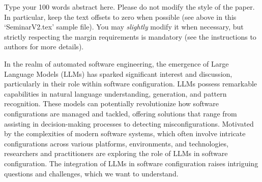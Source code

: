 Type your 100 words abstract here. Please do not modify the style
of the paper. In particular, keep the text offsets to zero when
possible (see above in this `SeminarV2.tex' sample file). You may
\emph{slightly} modify it when necessary, but strictly respecting
the margin requirements is mandatory (see the instructions to
authors for more details).

In the realm of automated software engineering, the
emergence of Large Language Models (LLMs) has sparked
significant interest and discussion, particularly in their role
within software configuration. LLMs possess remarkable
capabilities in natural language understanding, generation,
and pattern recognition. These models can potentially
revolutionize how software configurations are managed and
tackled, offering solutions that range from assisting in
decision-making processes to detecting misconfigurations.
Motivated by the complexities of modern software systems,
which often involve intricate configurations across various
platforms, environments, and technologies, researchers and
practitioners are exploring the role of LLMs in software
configuration. The integration of LLMs in software
configuration raises intriguing questions and challenges, which we want to understand.